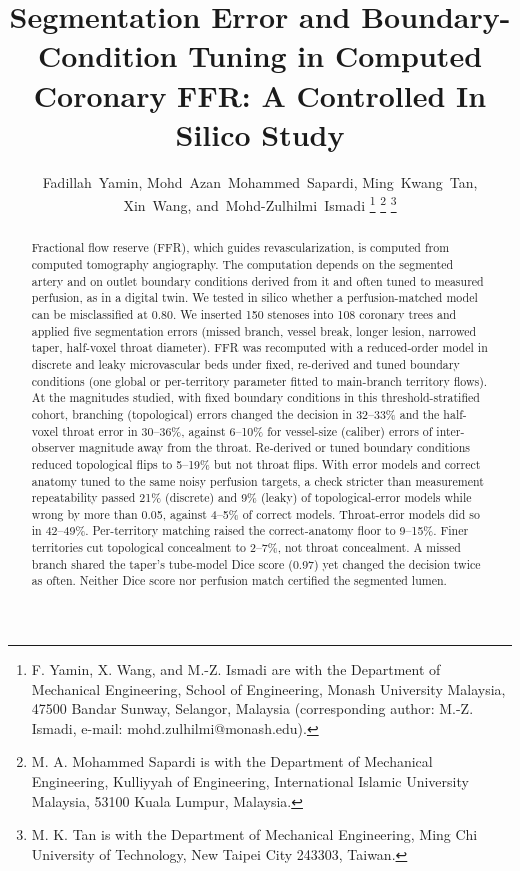 \documentclass[journal,twoside,web]{ieeecolor}
\begin{document}

\title{Segmentation Error and Boundary-Condition Tuning in Computed Coronary FFR: A Controlled In Silico Study}

\author{Fadillah~Yamin,
        Mohd~Azan~Mohammed~Sapardi,
        Ming~Kwang~Tan,
        Xin~Wang,
        and~\mbox{Mohd-Zulhilmi~Ismadi}\endgraf\vspace{-\baselineskip}%
\thanks{F. Yamin, X. Wang, and M.-Z. Ismadi are with the Department of Mechanical Engineering, School of
Engineering, Monash University Malaysia, 47500 Bandar Sunway, Selangor, Malaysia (corresponding author:
M.-Z. Ismadi, e-mail: mohd.zulhilmi@monash.edu).}%
\thanks{M. A. Mohammed Sapardi is with the Department of Mechanical Engineering, Kulliyyah of Engineering,
International Islamic University Malaysia, 53100 Kuala Lumpur, Malaysia.}%
\thanks{M. K. Tan is with the Department of Mechanical Engineering, Ming Chi University of Technology, New Taipei
City 243303, Taiwan.}}


\maketitle

\begin{abstract}
Fractional flow reserve (FFR), which guides revascularization, is computed from computed tomography
angiography. The computation depends on the segmented artery and on outlet boundary conditions derived from it and
often tuned to measured perfusion, as in a digital twin. We tested in silico whether a perfusion-matched model can be
misclassified at 0.80. We inserted 150 stenoses into 108 coronary trees and applied five segmentation errors (missed branch, vessel break, longer lesion, narrowed taper, half-voxel throat diameter). FFR was recomputed with a reduced-order model in
discrete and leaky microvascular beds under fixed, re-derived and tuned boundary conditions
(one global or per-territory parameter fitted to main-branch territory flows). At the magnitudes studied, with fixed boundary conditions in this threshold-stratified cohort,
branching (topological) errors changed the decision in 32--33\% and the half-voxel throat error in
30--36\%, against 6--10\% for vessel-size (caliber) errors of inter-observer magnitude away from the throat.
Re-derived or tuned boundary conditions reduced topological flips to 5--19\% but not throat flips. With error models and correct anatomy tuned to the same noisy perfusion targets, a check stricter than measurement
repeatability passed 21\% (discrete) and 9\% (leaky) of topological-error models while wrong by more than
0.05, against 4--5\% of correct models. Throat-error models did so in 42--49\%. Per-territory matching raised the
correct-anatomy floor to 9--15\%. Finer territories cut topological concealment to 2--7\%, not throat concealment. A missed branch shared the taper's tube-model Dice score (0.97) yet changed the decision twice as often.
Neither Dice score nor perfusion match certified the segmented lumen.
\end{abstract}
\end{document}
